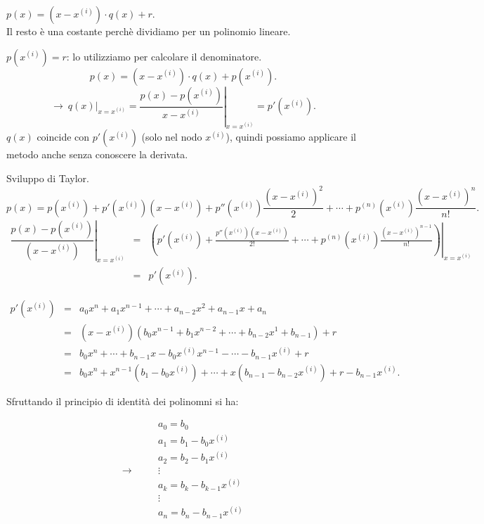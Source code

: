 $p(x) = (x-x^{(i)})\cdot q(x) + r$.\\
Il resto è una costante perchè dividiamo per un polinomio lineare.
\begin{flushleft}
$p(x^{(i)}) = r$: lo utilizziamo per calcolare il denominatore.
\[
p(x) = \left(x-x^{(i)}\right)\cdot q(x) + p\left(x^{(i)}\right).
\]
\[\longrightarrow \
\left.q(x)\right|_{x = x^{(i)}} = \left.\frac{p(x) - 
p \left(x^{(i)}\right)}{x-x^{(i)}} \right|_{x = x^{(i)}} = p'(x^{(i)}).
\]
$q(x)$ coincide con $p'(x^{(i)})$ (solo nel nodo $x^{(i)}$), quindi possiamo
applicare il metodo anche senza conoscere la derivata.
\end{flushleft}

Sviluppo di Taylor.
\[
p(x) = p\left(x^{(i)}\right) + p'\left(x^{(i)}\right)\left(x-x^{(i)}\right)+
p''\left(x^{(i)}\right)\frac{\left(x-x^{(i)}\right)^2}{2}+ \cdots +
p^{(n)}\left(x^{(i)}\right)\frac{\left(x-x^{(i)}\right)^n}{n!}.
\]
\[
\begin{array}{lcl}
\left.
\dfrac{p(x) - p\left(x^{(i)}\right)}{\left(x-x^{(i)}\right)}\right|_{x = x^{(i)}}
& = &\left.
\left( p'\left(x^{(i)}\right) + \frac{p''\left(x^{(i)}\right)\left(x-x^{(i)}
\right)}{2!} +
\cdots +
p^{(n)}\left(x^{(i)}\right)\frac{\left(x-x^{(i)}\right)^{n-1}}{n!}
\right)\right|_{x = x^{(i)}} \\
& = & p'(x^{(i)}).
\end{array}
\]


\[
\begin{array}{lcl}
p'(x^{(i)}) & = & a_0x^n + a_1 x^{n-1}+ \cdots + a_{n-2}x^2 +a_{n-1}x + a_n \\
& = &\left(x-x^{(i)}\right)\left(b_0 x^{n-1}+ b_1x^{n-2}+\cdots + b_{n-2}x^1 +b_{n-1}
 \right)+ r\\
& = &
b_0x^n + \cdots + b_{n-1}x -b_0 x^{(i)}x^{n-1} - \cdots -b_{n-1}x^{(i)} +r \\
& = &
b_0x^n + x^{n-1}\left(b_1-b_0 x^{(i)}\right)
+ \cdots + x\left(b_{n-1}-b_{n-2} x^{(i)}\right) + r - b_{n-1}x^{(i)}.
\end{array}
\]

Sfruttando il principio di identità dei polinomni si ha:

\[\longrightarrow\qquad\begin{array}{l}
a_0 = b_0 \\
a_1 = b_1 - b_0x^{(i)} \\
a_2 = b_2 - b_1x^{(i)} \\
\vdots \\
a_k = b_k - b_{k-1}x^{(i)} \\
\vdots \\
a_n = b_n - b_{n-1}x^{(i)} \\
\end{array}
\]

